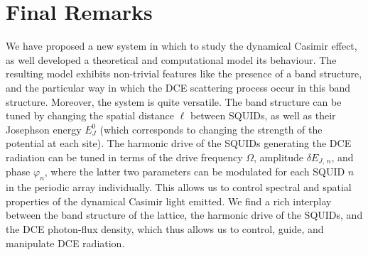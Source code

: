 \section{Final Remarks}\label{sec:remarks}

We have proposed a new system in which to study the dynamical Casimir effect, as well developed a theoretical and computational model its behaviour. The resulting model exhibits non-trivial features like the presence of a band structure, and the particular way in which the DCE scattering process occur in this band structure.
Moreover, the system is quite versatile. The band structure can be tuned by changing the spatial distance $\ell$ between SQUIDs, as well as their Josephson energy $E_J^0$ (which corresponds to changing the strength of the potential at each site). The harmonic drive of the SQUIDs generating the DCE radiation can be tuned in terms of the drive frequency $\Omega$, amplitude $\delta E_{J,\,n}$, and phase $\varphi_n$, where the latter two parameters can be modulated for each SQUID $n$ in the periodic array individually. This allows us to control spectral and spatial properties of the dynamical Casimir light emitted. We find a rich interplay between the band structure of the lattice, the harmonic drive of the SQUIDs, and the DCE photon-flux density, which thus allows us to control, guide, and manipulate DCE radiation. 
